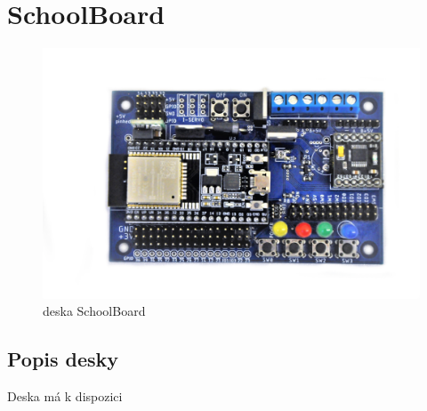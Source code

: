 \documentclass{template/socthesis}
\begin{document}
\chapter{SchoolBoard}

\begin{figure}[h]
	\centering
	\includegraphics[width=\textwidth]{img/RB3202.JPG}
	\caption{deska SchoolBoard}
\end{figure}

\section{Popis desky}

Deska má k dispozici
\end{document}
